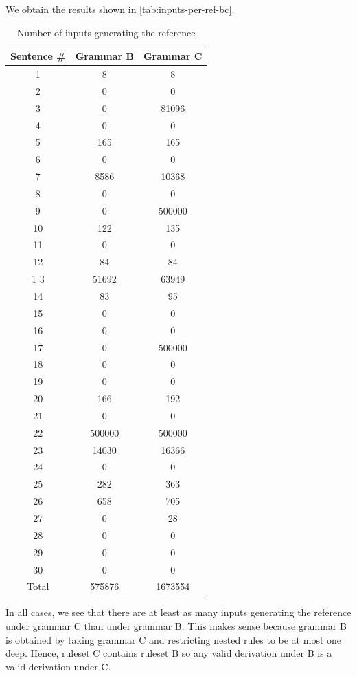 \documentclass[a4paper,oneside,reqno]{amsart}
\begin{document}
\begin{enumerate}[label=\arabic*.]
    We obtain the results shown in \autoref{tab:inputs-per-ref-bc}.
    \begin{table}[H]
      \begin{tabular}{ccc}
        \toprule
        Sentence \# & Grammar B & Grammar C \\
        \midrule
        1 & 8 & 8 \\
        2 & 0 & 0 \\
        3 & 0 & 81096 \\
        4 & 0 & 0 \\
        5 & 165 & 165 \\
        6 & 0 & 0 \\
        7 & 8586 & 10368 \\
        8 & 0 & 0 \\
        9 & 0 & 500000 \\
        10 & 122 & 135 \\
        11 & 0 & 0 \\
        12 & 84 & 84 \\
        1 3 & 51692 & 63949 \\
        14 & 83 & 95 \\
        15 & 0 & 0 \\
        16 & 0 & 0 \\
        17 & 0 & 500000 \\
        18 & 0 & 0 \\
        19 & 0 & 0 \\
        20 & 166 & 192 \\
        21 & 0 & 0 \\
        22 & 500000 & 500000 \\
        23 & 14030 & 16366 \\
        24 & 0 & 0 \\
        25 & 282 & 363 \\
        26 & 658 & 705 \\
        27 & 0 & 28 \\
        28 & 0 & 0 \\
        29 & 0 & 0 \\
        30 & 0 & 0 \\
        Total & 575876 & 1673554 \\
        \bottomrule
      \end{tabular}
      \caption{Number of inputs generating the reference}
      \label{tab:inputs-per-ref-bc}
    \end{table}
    In all cases, we see that there are at least as many inputs generating the
    reference under grammar C than under grammar B.  This makes sense because
    grammar B is obtained by taking grammar C and restricting nested rules to
    be at most one deep.  Hence, ruleset C contains ruleset B so any valid
    derivation under B is a valid derivation under C.


\end{enumerate}
\end{document}
